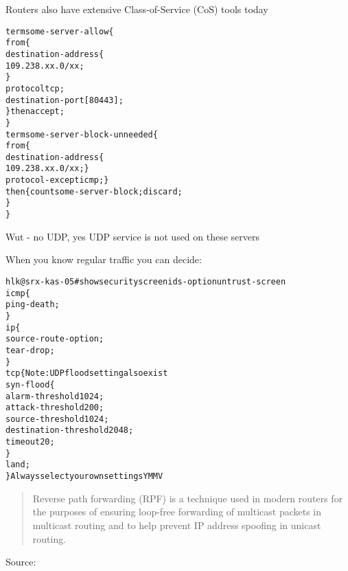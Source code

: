 \documentclass[Screen16to9,17pt]{foils}
\begin{document}
Routers also have extensive Class-of-Service (CoS) tools today


\begin{alltt}\footnotesize
term some-server-allow \{
    from \{
        destination-address \{
            109.238.xx.0/xx;
        \}
        protocol tcp;
        destination-port [ 80 443 ];
    \} then accept;
\}
term some-server-block-unneeded \{
    from \{
        destination-address \{
            109.238.xx.0/xx; \}
        protocol-except icmp;  \}
    then \{ count some-server-block; discard;
    \}
\}
\end{alltt}

Wut - no UDP, yes UDP service is not used on these servers



When you know regular traffic you can decide:

\begin{alltt}\footnotesize
hlk@srx-kas-05# show security screen ids-option untrust-screen
icmp \{
    ping-death;
\}
ip \{
    source-route-option;
    tear-drop;
\}
tcp \{    Note: UDP flood setting also exist
    syn-flood \{
        alarm-threshold 1024;
        attack-threshold 200;
        source-threshold 1024;
        destination-threshold 2048;
        timeout 20;
    \}
    land;
\} Always select your own settings YMMV
\end{alltt}



\begin{quote}
Reverse path forwarding (RPF) is a technique used in modern routers for the purposes of ensuring loop-free forwarding of multicast packets in multicast routing and to help prevent IP address spoofing in unicast routing.
\end{quote}
Source: 


\end{document}
